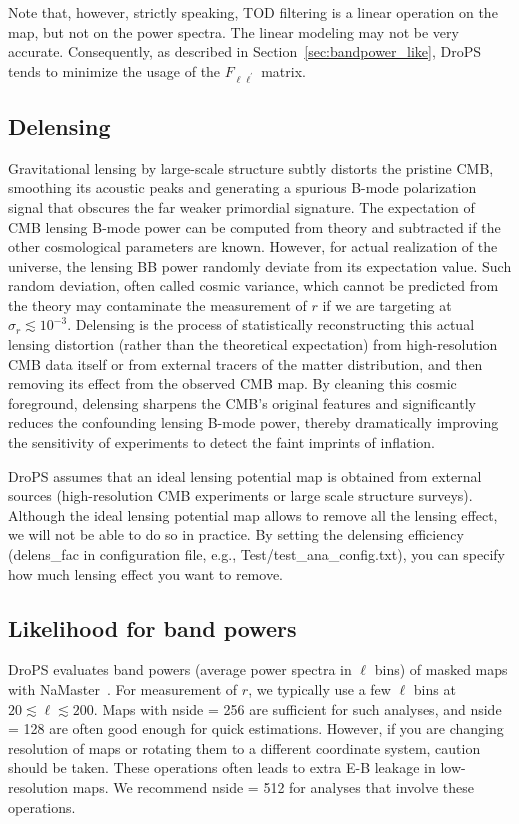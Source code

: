 \documentclass[12pt, a4paper]{ctexart} %
\begin{document}
Note that, however, strictly speaking, TOD filtering is a linear operation on the map, but not on the power spectra. The linear modeling may not be very accurate. Consequently, as described in Section~\ref{sec:bandpower_like}, DroPS tends to minimize the usage of the $F_{\ell\ell^\prime}$ matrix.

\subsection{Delensing}


Gravitational lensing by large-scale structure subtly distorts the pristine CMB, smoothing its acoustic peaks and generating a spurious B-mode polarization signal that obscures the far weaker primordial signature. The expectation of CMB lensing B-mode power can be computed from theory and subtracted if the other cosmological parameters are known. However, for actual realization of the universe, the lensing BB power randomly deviate from its expectation value. Such random deviation, often called cosmic variance, which cannot be predicted from the theory may contaminate the measurement of $r$ if we are targeting at $\sigma_r \lesssim 10^{-3}$. Delensing is the process of statistically reconstructing this actual lensing distortion (rather than the theoretical expectation) from high-resolution CMB data itself or from external tracers of the matter distribution, and then removing its effect from the observed CMB map. By cleaning this cosmic foreground, delensing sharpens the CMB's original features and significantly reduces the confounding lensing B-mode power, thereby dramatically improving the sensitivity of experiments to detect the faint imprints of inflation.

DroPS assumes that an ideal lensing potential map is obtained from external sources (high-resolution CMB experiments or large scale structure surveys). Although the ideal lensing potential map allows to remove all the lensing effect, we will not be able to do so in practice. By setting the delensing efficiency (delens\_fac in configuration file, e.g., Test/test\_ana\_config.txt), you can specify how much lensing effect you want to remove.

\subsection{Likelihood for band powers~\label{sec:bandpower_like}}

DroPS evaluates band powers (average power spectra in $\ell$ bins) of masked maps with NaMaster~\cite{NaMaster}. For measurement of $r$, we typically use a few $\ell$ bins at $20\lesssim \ell \lesssim 200$. Maps with nside = 256 are sufficient for such analyses, and nside = 128 are often good enough for quick estimations. However, if you are changing resolution of maps or rotating them to a different coordinate system, caution should be taken. These operations often leads to extra E-B leakage in low-resolution maps. We recommend nside = 512 for analyses that involve these operations.
\end{document}
